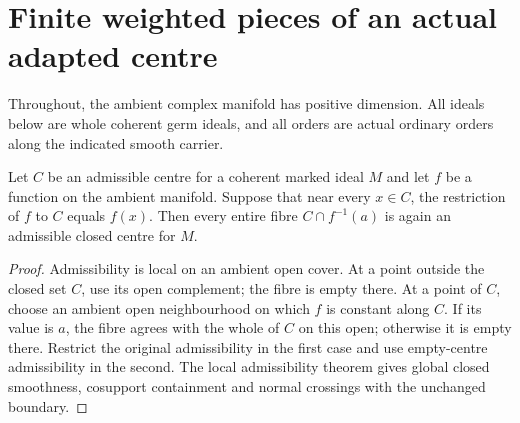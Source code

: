\section{Finite weighted pieces of an actual adapted centre}

Throughout, the ambient complex manifold has positive dimension. All
ideals below are whole coherent germ ideals, and all orders are actual
ordinary orders along the indicated smooth carrier.

\begin{theorem}
\label{hir:sharp-actual-locally-constant-admissible-fibres}
Let $C$ be an admissible centre for a coherent marked ideal $M$ and let
$f$ be a function on the ambient manifold. Suppose that near every
$x\in C$, the restriction of $f$ to $C$ equals $f(x)$. Then every entire
fibre $C\cap f^{-1}(a)$ is again an admissible closed centre for $M$.
\leanok
\end{theorem}
\begin{proof}
Admissibility is local on an ambient open cover. At a point outside the
closed set $C$, use its open complement; the fibre is empty there. At a
point of $C$, choose an ambient open neighbourhood on which $f$ is
constant along $C$. If its value is $a$, the fibre agrees with the whole
of $C$ on this open; otherwise it is empty there. Restrict the original
admissibility in the first case and use empty-centre admissibility in the
second. The local admissibility theorem gives global closed smoothness,
cosupport containment and normal crossings with the unchanged boundary.
\end{proof}

